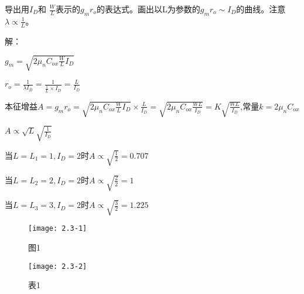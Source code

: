 




导出用$I_{D}$和 $\frac{W}{L}$表示的$g_mr_o$的表达式。画出以L为参数的$g_mr_o \sim I_{D}$的曲线。注意$\lambda \propto \frac{1}{L}$。

解：

$g_m=\sqrt{2\mu_nC_{ox}\frac{W}{L}I_D}$

$r_o=\frac{1}{\lambda I_D}=\frac{1}{\frac{1}{L} \times I_D}=\frac{L}{I_D}$

本征增益$A=g_mr_o=\sqrt{2\mu_nC_{ox}\frac{W}{L}I_D} \times \frac{L}{I_D}=\sqrt{2\mu_nC_{ox}\frac{WL}{I_D}}=K\sqrt{\frac{WL}{I_D}}$,常量$k=2\mu_nC_{ox}$

$A \propto \sqrt{L}\sqrt{\frac{1}{I_D}}$

当$L=L_1=1,I_D=2 \text{时}A \propto \sqrt{\frac{1}{2}}=0.707$

当$L=L_2=2,I_D=2 \text{时}A \propto \sqrt{\frac{2}{2}}=1$

当$L=L_3=3,I_D=2 \text{时}A \propto \sqrt{\frac{3}{2}}=1.225$

		\begin{figure}[H] %
	\begin{minipage}{\linewidth}
		\texttt{[image: 2.3-1]}
	\end{minipage}
		\caption*{图1} %
\end{figure}

\begin{figure}[H] %
	\begin{minipage}{\linewidth}
		\texttt{[image: 2.3-2]}
	\end{minipage}
		\caption*{表1} %
\end{figure}
